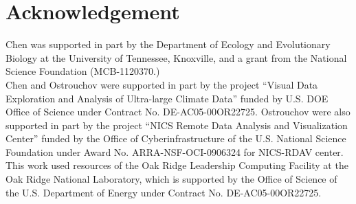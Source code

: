
\section*{Acknowledgement}

Chen was supported in part by
the Department of Ecology and Evolutionary Biology at the
University of Tennessee, Knoxville, and a grant from
the National Science Foundation (MCB-1120370.)
\\

Chen and Ostrouchov were supported in part by the project
``Visual Data Exploration and Analysis of Ultra-large Climate Data''
funded by U.S. DOE Office of Science
under Contract No. DE-AC05-00OR22725.
Ostrouchov were also supported in part by the project
``NICS Remote Data Analysis and Visualization Center''
funded by the Office of Cyberinfrastructure of the
U.S. National Science Foundation
under Award No. ARRA-NSF-OCI-0906324 for NICS-RDAV center.
\\

This work used resources of the Oak Ridge Leadership Computing Facility at the
Oak Ridge National Laboratory, which is supported by the Office of Science
of the U.S. Department of Energy under Contract No. DE-AC05-00OR22725.
\\

